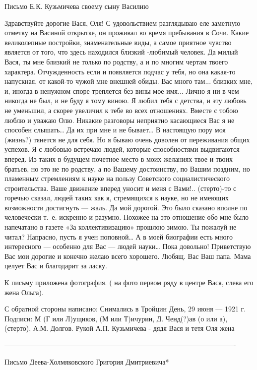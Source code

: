 \documentclass[]{memoir}
\begin{document}
Письмо Е.К. Кузьмичева своему сыну Василию


Здравствуйте дорогие Вася, Оля!
С удовольствием разглядываю еле заметную отметку на  Васиной открытке, он проживал во время пребывания в Сочи. Какие великолепные постройки, знаменательные виды, а самое приятное чувство является от того, что здесь находился близкий -любимый человек. Да милый Вася, ты мне близкий не только по родству, а и по многим чертам твоего характера. Отчужденность если и появляется подчас у тебя, но она какая-то напускная, от какой-то чужой  мне внешней обиды. Вас много там... близких мне, и, иногда в ненужном споре треплется без вины мое имя... Лично я ни в чем никогда не был, и не буду я тому виною. Я любил тебя с детства, и эту любовь не уменьшил, а скорее увеличил к тебе во всех отношениях. Вместе с тобою люблю и уважаю Олю. Никакие разговоры неприятно касающиеся Вас я не способен слышать… Да их при мне и не бывает…
В настоящую пору моя (жизнь?) тянется не для себя. Но я бываю очень доволен от переживания общих успехов. Я с любовью встречаю людей, которые способностями выдвигаются вперед. Из таких в будущем почетное место в моих желаниях твое и твоих братьев, но это не по родству, а по Вашему достоинству, по Вашим поздним, но пламенным стремлениям к науке на пользу Советского социалистического строительства. 
Ваше движение вперед уносит и меня с Вами!..
(стерто)-то с горечью сказал, людей таких как я, стремящихся к науке, но не имеющих возможности достигнуть — жаль. Да мой дорогой. Это было сказано вполне по человечески т. е. искренно и разумно. Похожее на это отношение обо мне было напечатано в газете «За коллективизацию» прошлою зимою. Ты пожалуй не читал? Напрасно, пусть я учен поповной… А в моей биографии есть много интересного — особенно для Вас — людей науки… Пока довольно! Приветствую Вас мои дорогие и конечно желаю всего хорошего.
Любящ. Вас Ваш папа.
Мама целует Вас и благодарит за ласку.

К письму приложена фотография. ( на фото первом ряду в центре Вася, слева его жена Ольга).  

С обратной стороны написано:
Снимались в Тройцин День, 29 июня — 1921 г.
Подписи: М (Г или Л)ущиков, (М или Т)ичурин, Д. Ченд(?)ав (о или а),  (стерто), А.М. Долгов. 
Рукой А.П. Кузьмичева -  дядя Вася и тетя Оля жена 

----------------------------------------------------------------------------------------------------

Письмо Деева-Холмяковского Григория Дмитриевича*
\end{document}
